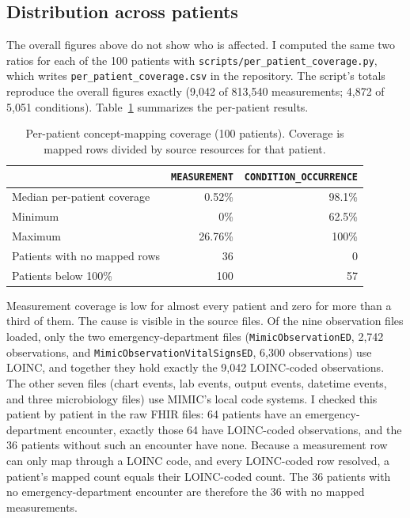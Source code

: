 \documentclass[11pt]{article}
\begin{document}
\subsection{Distribution across patients}
\label{sec:perpatient}

The overall figures above do not show who is affected. I computed the same
two ratios for each of the 100 patients with
\texttt{scripts/per\_patient\_coverage.py}, which writes
\texttt{per\_patient\_coverage.csv} in the repository. The script's totals
reproduce the overall figures exactly (9{,}042 of 813{,}540 measurements;
4{,}872 of 5{,}051 conditions). Table~\ref{tab:perpatient} summarizes the
per-patient results.

\begin{table}[h]
\centering
\caption{Per-patient concept-mapping coverage (100 patients). Coverage is
mapped rows divided by source resources for that patient.}
\label{tab:perpatient}
\begin{tabular}{lrr}
\toprule
 & \texttt{MEASUREMENT} & \texttt{CONDITION\_OCCURRENCE} \\
\midrule
Median per-patient coverage & 0.52\% & 98.1\% \\
Minimum & 0\% & 62.5\% \\
Maximum & 26.76\% & 100\% \\
Patients with no mapped rows & 36 & 0 \\
Patients below 100\% & 100 & 57 \\
\bottomrule
\end{tabular}
\end{table}

Measurement coverage is low for almost every patient and zero for more than
a third of them. The cause is visible in the source files. Of the nine
observation files loaded, only the two emergency-department files
(\texttt{MimicObservationED}, 2{,}742 observations, and
\texttt{MimicObservationVitalSignsED}, 6{,}300 observations) use LOINC, and
together they hold exactly the 9{,}042 LOINC-coded observations. The other
seven files (chart events, lab events, output events, datetime events, and
three microbiology files) use MIMIC's local code systems. I checked this
patient by patient in the raw FHIR files: 64 patients have an
emergency-department encounter, exactly those 64 have LOINC-coded
observations, and the 36 patients without such an encounter have none.
Because a measurement row can only map through a LOINC code, and every
LOINC-coded row resolved, a patient's mapped count equals their LOINC-coded
count. The 36 patients with no emergency-department encounter are therefore
the 36 with no mapped measurements.
\end{document}
